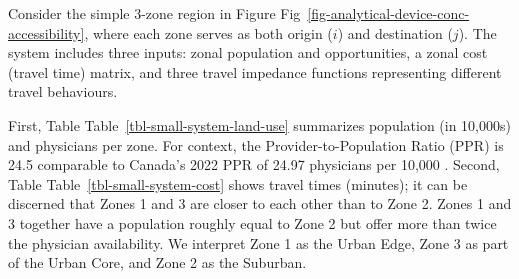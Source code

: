 \documentclass[
  10pt,
  letterpaper,
]{article}
\begin{document}
Consider the simple 3-zone region in Figure
Fig~\ref{fig-analytical-device-conc-accessibility}, where each zone
serves as both origin (\(i\)) and destination (\(j\)). The system
includes three inputs: zonal population and opportunities, a zonal cost
(travel time) matrix, and three travel impedance functions representing
different travel behaviours.

First, Table Table~\ref{tbl-small-system-land-use} summarizes population
(in 10,000s) and physicians per zone. For context, the
Provider-to-Population Ratio (PPR) is 24.5 comparable to Canada's 2022
PPR of 24.97 physicians per 10,000 \citep{whoMedicalDoctors102025}.
Second, Table Table~\ref{tbl-small-system-cost} shows travel times
(minutes); it can be discerned that Zones 1 and 3 are closer to each
other than to Zone 2. Zones 1 and 3 together have a population roughly
equal to Zone 2 but offer more than twice the physician availability. We
interpret Zone 1 as the Urban Edge, Zone 3 as part of the Urban Core,
and Zone 2 as the Suburban.

\begin{table}

\caption{\label{tbl-small-system-land-use}Simple system with three zones
(ID 1, 2 and 3). Population is in 10,000 persons and opportunities in
number of physicians.}


\end{table}%
\end{document}
